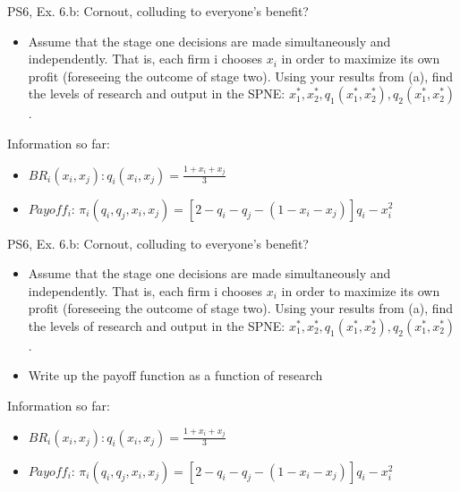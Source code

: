 \begin{frame}{PS6, Ex. 6.b: Cornout, colluding to everyone's benefit?}
    \begin{itemize}
    \item[(b)] Assume that the stage one decisions are made simultaneously and independently. That is, each firm i chooses $x_i$ in order to maximize its own profit (foreseeing the outcome of stage two). Using your results from (a), find the levels of research and output in the SPNE: $x_1^*,x_2^*,q_1(x_1^*,x_2^*),q_2(x_1^*,x_2^*)$.
    \end{itemize}
    \vfill\null
  \begin{multicols}{2}
    \vfill\null \columnbreak
    Information so far:
    \begin{itemize}
    \item[1] $BR_i(x_i,x_j): q_i(x_i,x_j)=\frac{1+x_i+x_j}{3}$
    \item[2] $Payoff_i$: $\pi_i(q_i,q_j,x_i,x_j) = [2-q_i-q_j-(1-x_i-x_j)]q_i-x_i^2$
    \end{itemize}
    \vfill\null
  \end{multicols}
\end{frame}

\begin{frame}{PS6, Ex. 6.b: Cornout, colluding to everyone's benefit?}
    \begin{itemize}
    \item[(b)] Assume that the stage one decisions are made simultaneously and independently. That is, each firm i chooses $x_i$ in order to maximize its own profit (foreseeing the outcome of stage two). Using your results from (a), find the levels of research and output in the SPNE: $x_1^*,x_2^*,q_1(x_1^*,x_2^*),q_2(x_1^*,x_2^*)$.
    \end{itemize}
    \vfill\null
  \begin{multicols}{2}
    \begin{itemize}
      \item[(Step 1)] Write up the payoff function as a function of research
    \end{itemize}
    \vfill\null \columnbreak
    Information so far:
    \begin{itemize}
    \item[1] $BR_i(x_i,x_j): q_i(x_i,x_j)=\frac{1+x_i+x_j}{3}$
    \item[2] $Payoff_i$: $\pi_i(q_i,q_j,x_i,x_j) = [2-q_i-q_j-(1-x_i-x_j)]q_i-x_i^2$
    \end{itemize}
    \vfill\null
  \end{multicols}
\end{frame}

